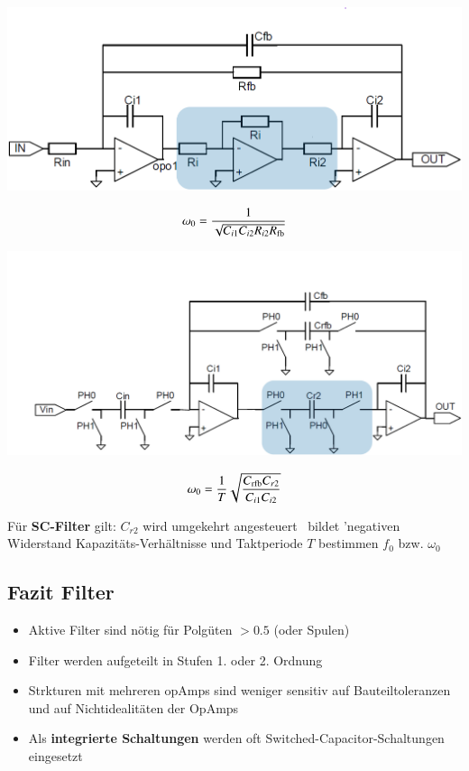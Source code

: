 \begin{minipage}[t]{0.48\columnwidth}
    \begin{center}
        \includegraphics[width=\columnwidth]{images/rc_filter.png}
    \end{center}
    $$ \omega_0 = \frac{1}{\sqrt{C_{i1} C_{i2} R_{i2} R_{\rm fb}}} $$
\end{minipage}
\hfill
\begin{minipage}[t]{0.48\columnwidth}
    \begin{center}
        \includegraphics[width=\columnwidth]{images/sc_filter.png}
    \end{center}

    $$ \omega_0 =  \frac{1}{T} \sqrt{ \frac{C_{\rm rfb} C_{r2}}{ C_{i1} C_{i2}} } $$
\end{minipage}

\begin{outline}
    \1 Für \textbf{SC-Filter} gilt:
        \2 $C_{r2}$ wird umgekehrt angesteuert \textrightarrow\ bildet 'negativen Widerstand
        \2 Kapazitäts-Verhältnisse und Taktperiode $T$ bestimmen $f_0$ bzw. $\omega_0$
\end{outline}

\subsection{Fazit Filter}

\begin{itemize}
    \item Aktive Filter sind nötig für Polgüten $> 0.5$ (oder Spulen)
    \item Filter werden aufgeteilt in Stufen 1. oder 2. Ordnung
    \item Strkturen mit mehreren opAmps sind weniger sensitiv auf Bauteiltoleranzen und auf Nichtidealitäten der OpAmps
    \item Als \textbf{integrierte Schaltungen} werden oft Switched-Capacitor-Schaltungen eingesetzt
\end{itemize}